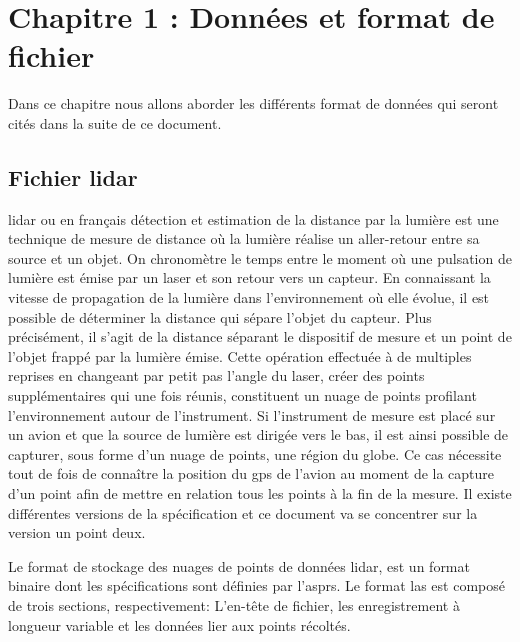 \chapter{Chapitre 1 : Données et format de fichier}


Dans ce chapitre nous allons aborder les différents format de données qui seront
cités dans la suite de ce document.

\section{Fichier lidar}

\gls{lidar} ou en français 
détection et estimation de la distance par la lumière est une technique de mesure de distance où la lumière réalise un 
aller-retour entre sa source et un objet. On chronomètre le temps entre le moment 
où une pulsation de lumière est émise par un laser et son retour vers un capteur.
En connaissant la vitesse de propagation de la lumière dans l’environnement où elle
évolue, il est possible de déterminer la distance qui sépare l’objet 
du capteur. Plus précisément, il s’agit de la distance séparant le dispositif de
mesure et un point de l’objet frappé par la lumière émise. 
Cette opération effectuée à de multiples reprises en changeant par petit pas 
l’angle du laser, créer des points supplémentaires qui une fois réunis,
constituent un nuage de points profilant l'environnement autour de l'instrument.
Si l'instrument de mesure est placé sur un avion et que la source de lumière est
dirigée vers le bas, il est ainsi possible de capturer, sous forme d'un nuage de
points, une région du globe. Ce cas nécessite tout de fois de connaître la position
du \gls{gps} de l'avion au moment de la capture d'un point afin de mettre en relation
tous les points à la fin de la mesure.
Il existe différentes versions de la spécification et ce document va se concentrer sur la version un point deux.

Le format de stockage des nuages de points de données \gls{lidar}, est un format
binaire dont les spécifications sont définies par l'\gls{asprs}.
Le format \gls{las} est composé de trois sections, respectivement:
L'en-tête de fichier, les enregistrement à longueur variable et les données lier aux points récoltés.

